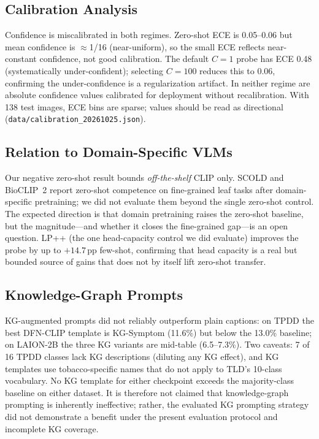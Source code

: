 \documentclass[10pt,a4paper]{article}
\begin{document}
\subsection{Calibration Analysis}

Confidence is miscalibrated in both regimes. Zero-shot ECE is 0.05--0.06 but mean confidence is $\approx$1/16 (near-uniform), so the small ECE reflects near-constant confidence, not good calibration. The default $C{=}1$ probe has ECE 0.48 (systematically under-confident); selecting $C{=}100$ reduces this to 0.06, confirming the under-confidence is a regularization artifact. In neither regime are absolute confidence values calibrated for deployment without recalibration. With 138 test images, ECE bins are sparse; values should be read as directional (\texttt{data/calibration\_20261025.json}).

\subsection{Relation to Domain-Specific VLMs}

Our negative zero-shot result bounds \emph{off-the-shelf} CLIP only. SCOLD and BioCLIP~2 report zero-shot competence on fine-grained leaf tasks after domain-specific pretraining; we did not evaluate them beyond the single zero-shot control. The expected direction is that domain pretraining raises the zero-shot baseline, but the magnitude---and whether it closes the fine-grained gap---is an open question. LP++ (the one head-capacity control we did evaluate) improves the probe by up to $+14.7$\,pp few-shot, confirming that head capacity is a real but bounded source of gains that does not by itself lift zero-shot transfer.

\subsection{Knowledge-Graph Prompts}

KG-augmented prompts did not reliably outperform plain captions: on TPDD the best DFN-CLIP template is KG-Symptom (11.6\%) but below the 13.0\% baseline; on LAION-2B the three KG variants are mid-table (6.5--7.3\%). Two caveats: 7 of 16 TPDD classes lack KG descriptions (diluting any KG effect), and KG templates use tobacco-specific names that do not apply to TLD's 10-class vocabulary. No KG template for either checkpoint exceeds the majority-class baseline on either dataset.
It is therefore not claimed that knowledge-graph prompting is inherently ineffective; rather, the evaluated KG prompting strategy did not demonstrate a benefit under the present evaluation protocol and incomplete KG coverage.
\end{document}
